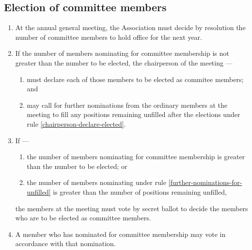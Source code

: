 \documentclass[../constitution.tex]{subfiles}
\begin{document}
\hypertarget{election-of-committee-members}{%
  \subsection{Election of committee members}\label{election-of-committee-members}}

\begin{enumerate}

  \item At the annual general meeting, the Association must decide by resolution the number of committee members to hold office for the next year.


  \item If the number of members nominating for committee membership is not greater than the number to be elected, the chairperson of the meeting --- \label{nominating-committee-less-than-elected}

        \begin{enumerate}

          \item must declare each of those members to be elected as commitee members; and \label{chairperson-declare-elected}
          \item may call for further nominations from the ordinary members at the meeting to fill any positions remaining unfilled after the elections under rule \ref{chairperson-declare-elected}. \label{further-nominations-for-unfilled}
        \end{enumerate}
  \item If ---

        \begin{enumerate}

          \item the number of members nominating for committee membership is greater than the number to be elected; or
          \item the number of members nominating under rule \ref{further-nominations-for-unfilled} is greater than the number of positions remaining unfilled,
        \end{enumerate}

        the members at the meeting must vote by secret ballot to decide the members who are to be elected as committee members.

  \item A member who has nominated for committee membership may vote in accordance with that nomination.
\end{enumerate}
\end{document}
